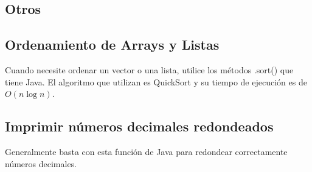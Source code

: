 \documentclass{article}
\begin{document}
\begin{multicols}{2}
\section{Otros}
	\subsection{Ordenamiento de Arrays y Listas}
	Cuando necesite ordenar un vector o una lista, utilice los métodos .sort() que tiene 		Java. El algoritmo que utilizan es QuickSort y su tiempo de ejecución es de \( O(n\log n) \).	
	
	\subsection{Imprimir números decimales redondeados}
	Generalmente basta con esta función de Java para redondear correctamente números decimales.	
\end{multicols}	
\end{document}
